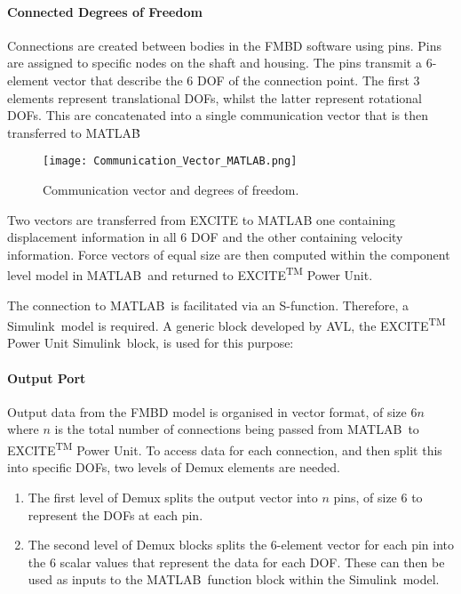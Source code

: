 \paragraph{Connected Degrees of Freedom}

Connections are created between bodies in the FMBD software using pins. Pins are assigned to specific nodes on the shaft and housing. The pins transmit a 6-element vector that describe the 6 DOF of the connection point. The first 3 elements represent translational DOFs, whilst the latter represent rotational DOFs. This are concatenated into a single communication vector that is then transferred to MATLAB\textregistered\.

\begin{figure}
	\centering  
	\texttt{[image: Communication\_Vector\_MATLAB.png]}
	\caption{Communication vector and degrees of freedom.}
	\label{Communication_Vector_MATLAB}
\end{figure} 

Two vectors are transferred from EXCITE to MATLAB\textregistered\: one containing displacement information in all 6 DOF and the other containing velocity information. Force vectors of equal size are then computed within the component level model in MATLAB\textregistered\ and returned to EXCITE\textsuperscript{TM} Power Unit.

The connection to MATLAB\textregistered\ is facilitated via an S-function. Therefore, a Simulink\textregistered\ model is required. A generic block developed by AVL, the EXCITE\textsuperscript{TM} Power Unit Simulink\textregistered\ block, is used for this purpose:

\paragraph{Output Port}

Output data from the FMBD model is organised in vector format, of size 6$n$ where $n$ is the total number of connections being passed from MATLAB\textregistered\ to EXCITE\textsuperscript{TM} Power Unit. To access data for each connection, and then split this into specific DOFs, two levels of Demux elements are needed.

\begin{enumerate}
	\item The first level of Demux splits the output vector into $n$ pins, of size 6 to represent the DOFs at each pin. 
	\item The second level of Demux blocks splits the 6-element vector for each pin into the 6 scalar values that represent the data for each DOF. These can then be used as inputs to the MATLAB\textregistered\ function block within the Simulink\textregistered\ model.	
\end{enumerate}

